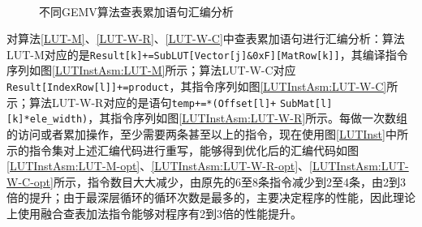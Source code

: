 \begin{figure}[htbp!]
	\centering
    \\
	\caption{不同GEMV算法查表累加语句汇编分析}
    \label{LUTInstAsm}
\end{figure}

对算法\ref{LUT-M}、\ref{LUT-W-R}、\ref{LUT-W-C}中查表累加语句进行汇编分析：算法LUT-M对应的是\verb|Result[k]+=SubLUT[Vector[j]&0xF][MatRow[k]]|，其编译指令序列如图\ref{LUTInstAsm:LUT-M}所示；算法LUT-W-C对应\verb|Result[IndexRow[l]]+=product|，其指令序列如图\ref{LUTInstAsm:LUT-W-C}所示；算法LUT-W-R对应的是语句\verb|temp+=*(Offset[l]+|     \verb|SubMat[l][k]*ele_width)|，其指令序列如图\ref{LUTInstAsm:LUT-W-R}所示。每做一次数组的访问或者累加操作，至少需要两条甚至以上的指令，现在使用图\ref{LUTInst}中所示的指令集对上述汇编代码进行重写，能够得到优化后的汇编代码如图\ref{LUTInstAsm:LUT-M-opt}、\ref{LUTInstAsm:LUT-W-R-opt}、\ref{LUTInstAsm:LUT-W-C-opt}所示，指令数目大大减少，由原先的6至8条指令减少到2至4条，由2到3倍的提升；由于最深层循环的循环次数是最多的，主要决定程序的性能，因此理论上使用融合查表加法指令能够对程序有2到3倍的性能提升。

